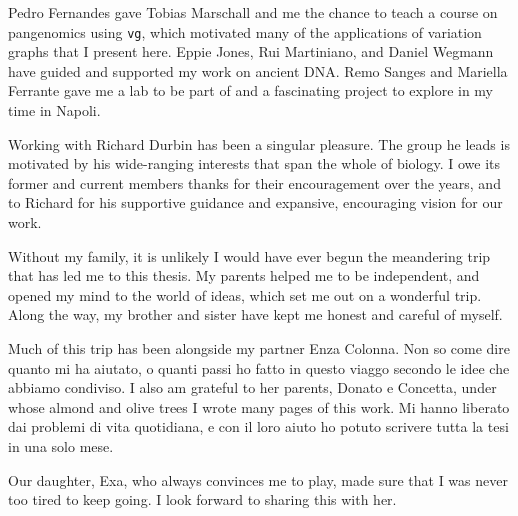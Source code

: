 \begin{acknowledgements}
  Pedro Fernandes gave Tobias Marschall and me the chance to teach a course on pangenomics using {\tt vg}, which motivated many of the applications of variation graphs that I present here.
  Eppie Jones, Rui Martiniano, and Daniel Wegmann have guided and supported my work on ancient DNA.
  Remo Sanges and Mariella Ferrante gave me a lab to be part of and a fascinating project to explore in my time in Napoli.
  
  Working with Richard Durbin has been a singular pleasure.
  The group he leads is motivated by his wide-ranging interests that span the whole of biology.
  I owe its former and current members thanks for their encouragement over the years, and to Richard for his supportive guidance and expansive, encouraging vision for our work.

  Without my family, it is unlikely I would have ever begun the meandering trip that has led me to this thesis.
  My parents helped me to be independent, and opened my mind to the world of ideas, which set me out on a wonderful trip.
  Along the way, my brother and sister have kept me honest and careful of myself.

  Much of this trip has been alongside my partner Enza Colonna.
  Non so come dire quanto mi ha aiutato, o quanti passi ho fatto in questo viaggo secondo le idee che abbiamo condiviso.
  I also am grateful to her parents, Donato e Concetta, under whose almond and olive trees I wrote many pages of this work.
  Mi hanno liberato dai problemi di vita quotidiana, e con il loro aiuto ho potuto scrivere tutta la tesi in una solo mese.
  
  Our daughter, Exa, who always convinces me to play, made sure that I was never too tired to keep going.
  I look forward to sharing this with her.


\end{acknowledgements}
